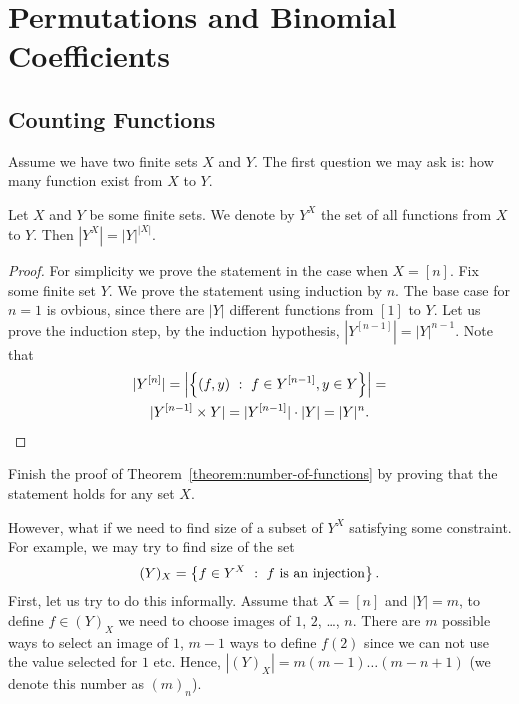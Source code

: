\chapter{Permutations and Binomial Coefficients}
\section{Counting Functions}
Assume we have two finite sets $X$ and $Y$. The first question we may ask is:
how many function exist from $X$ to $Y$.


\begin{theorem}
\label{theorem:number-of-functions}
  Let $X$ and $Y$ be some finite sets. We denote by $Y^X$ the set of all
  functions from $X$ to $Y$. Then $|Y^X| = |Y|^{|X|}$.
\end{theorem}
\begin{proof}
  For simplicity we prove the statement in the case when $X = [n]$. Fix some
  finite set $Y$. We prove the statement using induction by $n$. The base case
  for $n = 1$ is ovbious, since there are $|Y|$ different functions from $[1]$
  to $Y$. Let us prove the induction step, by the induction hypothesis,
  $|Y^{[n - 1]}| = |Y|^{n - 1}$. Note that
  \begin{multline*}
    |Y^{[n]}| = \left| \set[f \in Y^{[ n - 1]}, y \in Y]{(f, y)} \right| = \\
    |Y^{[n - 1]} \times Y| = |Y^{[n - 1]}| \cdot |Y| = |Y|^n.
  \end{multline*}
\end{proof}

\begin{exercise}
  Finish the proof of Theorem~\ref{theorem:number-of-functions} by proving that
  the statement holds for any set $X$.
\end{exercise}

However, what if we need to find size of a subset of $Y^X$ satisfying some
constraint. For example, we may try to find size of the set
\[
  (Y)_X = \set[f\text{ is an injection}]{f \in Y^X}.
\]
First, let us try to do this informally. Assume that $X = [n]$ and $|Y| = m$,
to define $f \in (Y)_X$ we need to choose images of $1$, $2$, \dots, $n$. There
are $m$ possible ways to select an image of $1$, $m - 1$ ways to define $f(2)$
since we can not use the value selected for $1$ etc. Hence,
$|(Y)_X| = m (m - 1) \dots (m - n + 1)$ (we denote this number as $(m)_n$).


